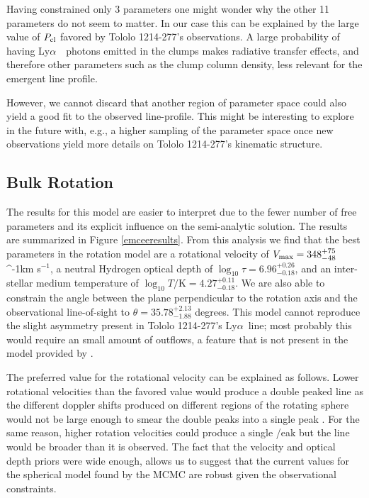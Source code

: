 \documentclass[a4paper,fleqn,usenatbib]{mnras}
\newcommand{\tol}{Tololo 1214-277}
\newcommand{\lya}{\ifmmode{{\rm Ly}\alpha}\else Ly$\alpha$\ \fi}
\newcommand{\kms}{\ifmmode\mathrm{km\ s}^{-1}\else km s$^{-1}$\fi}
\begin{document}
Having constrained only 3 parameters one might wonder why the other 11
parameters do not seem to matter.
In our case this can be explained by the large value of $P_{\rm cl}$
favored by \tol's observations. 
A large probability of having \lya\ photons emitted in the clumps
makes radiative transfer effects, and therefore other parameters such
as the clump column density, less relevant for the emergent line
profile. 


However, we cannot discard that another region of parameter space
could also yield a good fit to the observed line-profile.
This might be interesting to explore in the
future with, e.g., a higher sampling of the parameter space once new 
observations  yield more details on \tol's kinematic structure. 

\subsection{Bulk Rotation}

The results for this model are easier to interpret due to the fewer
number of free parameters and its explicit influence on the
semi-analytic solution.
The results are summarized in  Figure \ref{emceeresults}. 
From this analysis we find that the best parameters in the rotation
model are a rotational velocity of  $V_{\rm max}=348^{+75}_{-48}$
\kms, a neutral Hydrogen optical depth of
$\log_{10}\tau=6.96^{+0.26}_{-0.18}$,  and an inter-stellar medium
temperature of $\log_{10} T/\mathrm {K} = 4.27^{+0.11}_{-0.18}$.   
We are also able to constrain the angle between the plane
perpendicular to the rotation axis and the observational line-of-sight
to $\theta = 35.78^{+2.13}_{-1.88}$ degrees.
This model cannot reproduce the slight asymmetry present in \tol's
\lya line; most probably this would require an small amount of
outflows, a feature that is not present in the model provided by
\cite{GaravitoCamargo2014}. 

The preferred value for the rotational velocity can be explained as
follows. 
Lower rotational velocities than the favored value would produce a
double peaked line as the different doppler shifts produced on
different regions of the rotating sphere would not be large enough to
smear the double peaks into a single peak
\citep{GaravitoCamargo2014}. 
For the same reason, higher rotation velocities could produce a single
/eak but the line would be broader than it is observed.
The fact that the velocity and optical depth priors were wide enough,
allows us to suggest that the current values for the spherical model
found by the MCMC are robust given the observational constraints.
\end{document}
